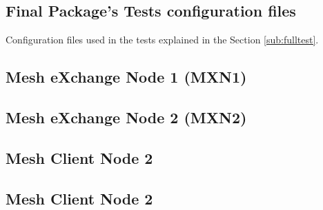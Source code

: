 \begin{appendices}

\chapter{Final Package's Tests configuration files}
\label{app:ch:full}
Configuration files used in the tests explained in the Section \ref{sub:fulltest}.

\section{Mesh eXchange Node 1 (MXN1)}









\section{Mesh eXchange Node 2 (MXN2)}








\section{Mesh Client Node 2}



\section{Mesh Client Node 2}


\end{appendices}